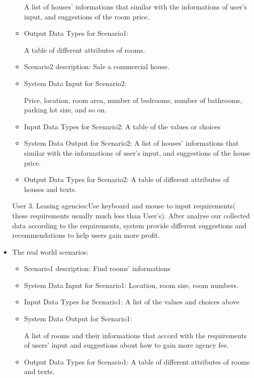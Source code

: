 \begin{itemize}
\begin{itemize}
	A list of houses' informations that similar with the informations of user's input, and suggestions of the room price.
	\item{Output Data Types for Scenario1: }

	A table of different attributes of rooms.

	\end{itemize}

	\begin{itemize}

	\item{Scenario2 description: }
	Sale a commercial house.
	\item{System Data Input for Scenario2: }

	Price, location, room area, number of bedrooms, number of bathrooms, parking lot size, and so on.
	\item{Input Data Types for Scenario2: }
	A table of the values or choices  
	\item{System Data Output for Scenario2: }
	A list of houses' informations that similar with the informations of user's input, and suggestions of the house price.
	\item{Output Data Types for Scenario2: }
	A table of different attributes of houses and texts.

	\end{itemize}

User 3. Leasing agencies:Use keyboard and mouse to input requirements( these requirements usually much less than User's). After analyse our collected data according to the requirements, system provide different suggestions and recommendations to help users gain more profit.
\item{The real world scenarios: }
	\begin{itemize}
	\item{Scenario1 description: }
	Find rooms' informations
	\item{System Data Input for Scenario1: }
	Location, room size, room numbers.
	\item{Input Data Types for Scenario1: }
	A list of the values and choices  above
	\item{System Data Output for Scenario1: }

	A list of rooms and their informations that accord with the requirements of users' input and suggestions about how to gain more agency fee. 
	\item{Output Data Types for Scenario1: }
	A table of different attributes of rooms and texts.
	

\end{itemize}
\end{itemize}
